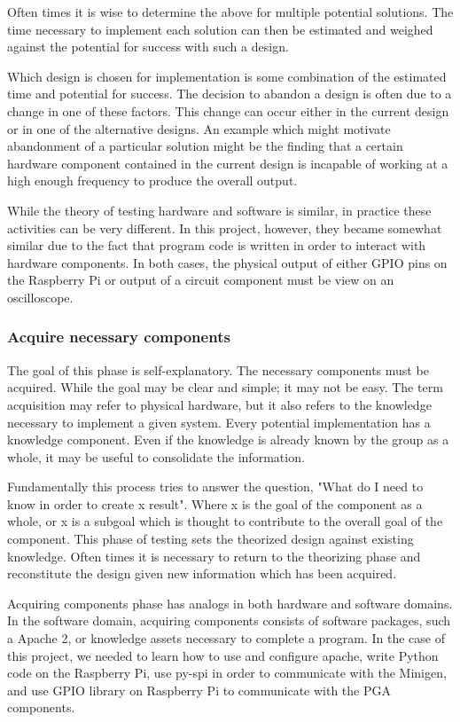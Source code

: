 \documentclass{article}	%
\begin{document}
\begin{multicols}{2}
Often times it is wise to determine the above for
multiple potential solutions.
The time necessary to implement each solution
can then be estimated and weighed against
the potential for success with such a design.

Which design is chosen for implementation is
some combination of the estimated time and
potential for success.
The decision to abandon a design is often
due to a change in one of these factors.
This change can occur either
in the current design or
in one of the alternative designs.
An example which might motivate abandonment of a 
particular solution might be
the finding that a certain hardware component
contained in the current design is incapable of 
working at a high enough frequency to
produce the overall output.

While the theory of testing hardware and software is similar,
in practice these activities can be very different.
In this project, however,
they became somewhat similar 
due to the fact that program code is written in order to 
interact with hardware components.
In both cases,
the physical output of either GPIO pins on the Raspberry Pi
or output of a circuit component must be view on
an oscilloscope.

\subsubsection{Acquire necessary components}
The goal of this phase is self-explanatory.
The necessary components must be acquired.
While the goal may be clear and simple;
it may not be easy.
The term acquisition may refer to  physical hardware,
but it also refers to the knowledge necessary to implement
a given system.
Every potential implementation has a knowledge component.
Even if the knowledge is already known by the group as a whole,
it may be useful to consolidate the information.

Fundamentally this process tries to answer the question,
"What do I need to know in order to create x result".
Where x is the goal of the component as a whole, or
x is a subgoal which is thought to contribute to 
the overall goal of the component.
This phase of testing
sets the theorized design against existing knowledge.
Often times it is necessary to return to the 
theorizing phase and reconstitute the design
given new information which has been acquired.

Acquiring components phase has analogs in both hardware and software domains.
In the software domain,
acquiring components consists of
software packages, such a Apache 2, or
knowledge assets necessary to complete a program.
In the case of this project,
we needed to learn how to use and configure apache,
write Python code on the Raspberry Pi,
use py-spi in order to communicate with the Minigen, and
use GPIO library on Raspberry Pi to communicate with the PGA components.


\end{multicols}
\end{document}
